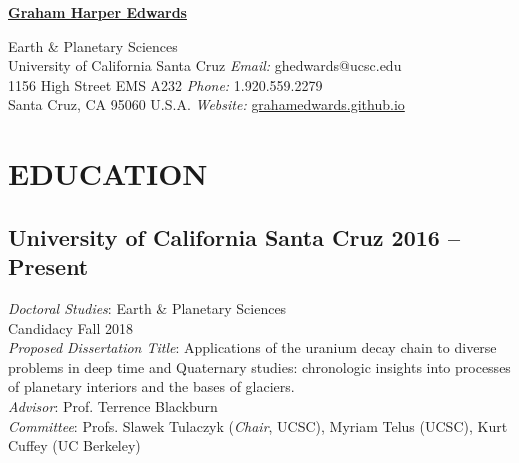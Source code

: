 \documentclass[10pt]{article}
\begin{document}

\begingroup
\centering \LARGE \textbf{\underline{Graham Harper Edwards}} \\ [1em]
\endgroup

Earth \& Planetary Sciences \\
University of California Santa Cruz \hfill \textit{Email:} ghedwards@ucsc.edu \\
1156 High Street EMS A232 \hfill \textit{Phone:} 1.920.559.2279 \\
Santa Cruz, CA 95060 U.S.A.	\hfill \textit{Website:} \href{https://grahamedwards.github.io}{grahamedwards.github.io}

\vspace{2ex}
\iffalse
\section{STATEMENT}

\textbf{Research} \ I am a geochemist and geochronologist: my primary research interest is to resolve and refine timescales of Earth and solar system processes via radiometric records. My doctoral research has focused on the application of the uranium decay systems to uncover the tempos of high-temperature processes in deep time and subglacial processes in the Quaternary. In my future work, I am excited to hone my statistical techniques to apply to database studies of meteorite chemistries.

In addition to my research interests, I am dually committed to the inclusion, support, and retention of individuals and groups of diverse identities and backgrounds.
\fi


\section*{EDUCATION}

\subsection*{\textbf{University of California Santa Cruz} \hfill 2016 – Present}
\textit{Doctoral Studies}: Earth \& Planetary Sciences\\
Candidacy Fall 2018 \\
\textit{Proposed Dissertation Title}: Applications of the uranium decay chain to diverse problems in deep time and Quaternary studies: chronologic insights into processes of planetary interiors and the bases of glaciers.\\
\textit{Advisor}: Prof. Terrence Blackburn\\
\textit{Committee}: Profs. Slawek Tulaczyk ({\sl Chair}, UCSC), Myriam Telus (UCSC), Kurt Cuffey (UC Berkeley)
\end{document}
